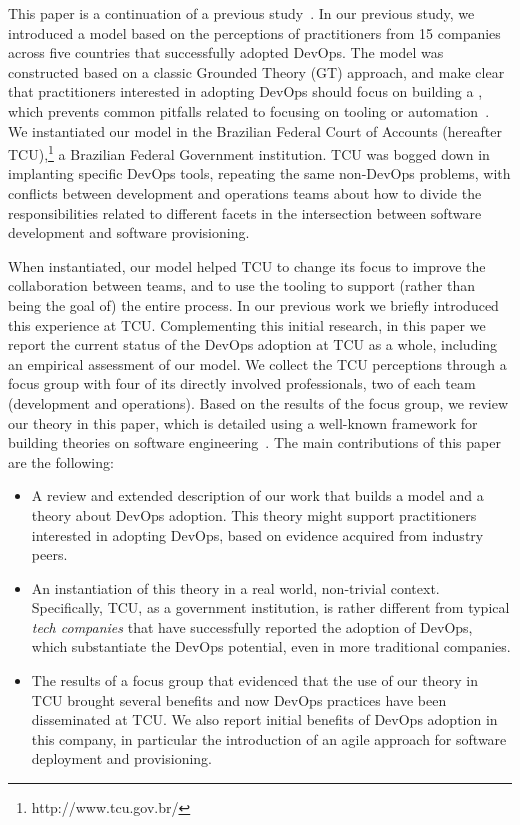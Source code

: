 This paper is a continuation of a previous study~\cite{Luz:2018:ESEM}.
In our previous study, we introduced a model based on the perceptions of practitioners from
15 companies across five countries that successfully adopted DevOps. The model
was constructed based on a classic Grounded Theory (GT) approach,
and make clear that practitioners interested in adopting DevOps should focus on building a
\cc, which prevents common pitfalls related to focusing on tooling or automation~\cite{Kromhout:2017:Queue}.
We instantiated our model in the Brazilian Federal Court of
Accounts (hereafter TCU),\footnote{http://www.tcu.gov.br/} a Brazilian Federal Government institution. TCU was
bogged down in implanting specific DevOps tools, repeating the same non-DevOps
problems, with conflicts between development and operations teams about how to
divide the responsibilities related to different facets in the intersection
between software development and software provisioning.

When instantiated,
our model helped TCU to change its focus to improve the collaboration between teams, and to use the tooling
to support (rather than being the goal of) the entire process.
In our previous work
we briefly introduced this experience at TCU.
Complementing this initial research, in this paper we report the current status 
of the DevOps adoption at TCU as a whole, including an empirical assessment of our model.
We collect the TCU perceptions through a focus group with four of its directly
involved professionals, two of each team (development and operations). Based on
the results of the focus group, we review our theory in this paper, which is
detailed using a well-known framework for building theories on software engineering~\cite{sjoberg2008}.
The main contributions of this paper are the following:

\begin{itemize}
\item A review and extended description of our work that builds a model and
  a theory about DevOps adoption. This theory might support practitioners interested in adopting DevOps,
  based on evidence acquired from industry peers.
  
\item An instantiation of this theory in a real world, non-trivial context. Specifically, TCU,
  as a government institution, is rather different from typical \emph{tech companies} that have
  successfully reported the adoption of DevOps, which substantiate the DevOps potential, even in more traditional
  companies.
  
\item The results of a focus group that evidenced that the use of our theory in TCU brought several
  benefits and now DevOps practices have been disseminated at TCU. We also report initial benefits
  of DevOps adoption in this company, in particular the introduction of an agile approach for software
  deployment and provisioning.
  
\end{itemize}
